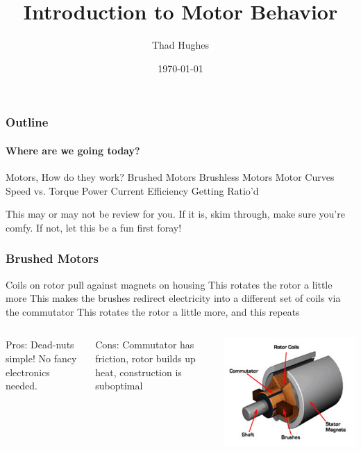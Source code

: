 \documentclass{beamer}%
\title{Introduction to Motor Behavior}
\author{Thad Hughes}
\date{\today}
\begin{document}
\maketitle

\begin{frame}
\frametitle{Outline}
\framesubtitle{Where are we going today?}

\begin{outline}
\1 Motors, How do they work?
	\2 Brushed Motors
	\2 Brushless Motors
\1 Motor Curves
	\2 Speed vs. Torque
	\2 Power
	\2 Current
	\2 Efficiency
\1 Getting Ratio'd
\end{outline}

\begin{block}{}
	This may or may not be review for you. If it is, skim through, make sure you're comfy. If not, let this be a fun first foray!
\end{block}

\end{frame}

\begin{frame}
	\frametitle{Brushed Motors}
	
	\begin{outline}
		\1 Coils on rotor pull against magnets on housing
		\1 This rotates the rotor a little more
		\1 This makes the brushes redirect electricity into a different set of coils via the commutator
		\1 This rotates the rotor a little more, and this repeats
	\end{outline}
	\begin{columns}
	\begin{block}{}
	Pros: Dead-nuts simple! No fancy electronics needed.
	\end{block}
	
	\begin{block}{}
	Cons: Commutator has friction, rotor builds up heat, construction is suboptimal
	\end{block}
	\includegraphics[width=\textwidth]{img_Mechatronics_Motors_brushed.png}
	\end{columns}
\end{frame}
\end{document}
